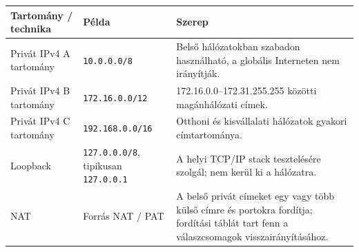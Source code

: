 \begin{tabularx}{\textwidth}{L{37mm}L{39mm}X}
\toprule
\textbf{Tartomány / technika} & \textbf{Példa} & \textbf{Szerep} \\
\midrule
Privát IPv4 A tartomány & \texttt{10.0.0.0/8} & Belső hálózatokban szabadon használható, a globális Interneten nem irányítják. \\
Privát IPv4 B tartomány & \texttt{172.16.0.0/12} & 172.16.0.0--172.31.255.255 közötti magánhálózati címek. \\
Privát IPv4 C tartomány & \texttt{192.168.0.0/16} & Otthoni és kisvállalati hálózatok gyakori címtartománya. \\
Loopback & \texttt{127.0.0.0/8}, tipikusan \texttt{127.0.0.1} & A helyi TCP/IP stack tesztelésére szolgál; nem kerül ki a hálózatra. \\
NAT & Forrás NAT / PAT & A belső privát címeket egy vagy több külső címre és portokra fordítja; fordítási táblát tart fenn a válaszcsomagok visszairányításához. \\
\bottomrule
\end{tabularx}
